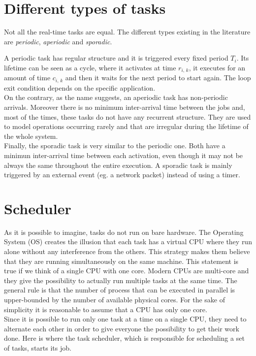 \section{Different types of tasks}
Not all the real-time tasks are equal. The different types existing in
the literature are \emph{periodic}, \emph{aperiodic} and \emph{sporadic}.

A periodic task has regular structure
and it is triggered every fixed period \( T_{i} \). Its lifetime can be seen as
a cycle, where it activates at time \( r_{i,\,k} \), it executes for an amount 
of time \( c_{i,\,k} \) and then it waits for the next period to start again.
The loop exit condition depends on the specific application.\\
On the contrary, as the name suggests, an aperiodic task has non-periodic arrivals.
Moreover there is no minimum inter-arrival time between the jobs and,
most of the times, these tasks do not have any recurrent structure. They are used
to model operations occurring rarely and that are irregular during the lifetime
of the whole system.\\
Finally, the sporadic task is very similar to the periodic one. Both have a minimun
inter-arrival time between each activation, even though it may not be always the
same throughout the entire execution. A sporadic task is mainly triggered by an
external event (eg. a network packet) instead of using a timer.


\section{Scheduler} \label{sec:scheduler}
As it is possible to imagine, tasks do not run on bare hardware.
The Operating System (OS) creates the illusion that each task has a virtual CPU
where they run alone without any interference from the others.
This strategy makes them believe that they are running simultaneously on the same
machine. This statement is true if we think of a single CPU with one core. Modern
CPUs are multi-core and they give the possibility to actually run multiple tasks
at the same time. The general rule is that the number of process that can be
executed in parallel is upper-bounded by the number of available physical cores.
For the sake of simplicity it is reasonable to assume that a CPU has only one core.\\
Since it is possible to run only one task at a time on a single CPU, they need
to alternate each other in order to give everyone the possibility to get their
work done. Here is where the task scheduler, which is responsible for
scheduling a set of tasks, starts its job.

